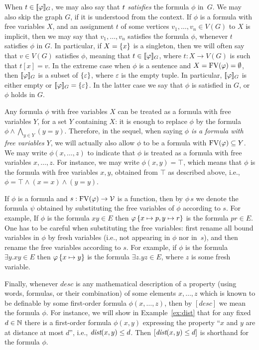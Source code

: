 When $t\in[\![\varphi]\!]_G$, we may also say that $t$ \emph{satisfies}
the formula $\phi$ in~$G$. We may also skip the graph $G$,
if it is understood from the context.
 If $\phi$ is a formula with 
free variables $X$, and an assignment $t$ of some vertices
$v_1,\ldots,v_n\in V(G)$  to $X$ is implicit,
then we may say that $v_1,\ldots,v_n$ 
satisfies the formula $\phi$, whenever  $t$ satisfies $\phi$ in $G$. In particular, if $X=\{x\}$ is a singleton, 
then we will often say that $v\in V(G)$ satisfies $\phi$,
meaning that  $t\in [\![\varphi]\!]_G$, where $t:X\to V(G)$ is  such that $t[x]=v$. In the extreme case when
$\phi$ is a sentence and $X=\textrm{FV}(\varphi)=\emptyset$, then $[\![\varphi]\!]_G$
is a subset of $\{\varepsilon\}$, where $\varepsilon$
is the {empty tuple}. In particular, $[\![\varphi]\!]_G$ is either empty  or $[\![\varphi]\!]_G=\{\varepsilon\}$. In the latter case we say that $\phi$ is satisfied in $G$, or $\phi$ holds in $G$. 

Any formula $\phi$ with free variables $X$ can be treated as a formula with free variables $Y$, for a set $Y$ containing $X$: it is enough to replace $\phi$
by the formula $\phi\land \bigwedge_{y\in Y}(y=y)$.
Therefore, in the sequel, when saying $\phi$
\emph{is a formula with free variables} $Y$, we will actually also allow $\phi$ to be a formula with $\textrm{FV}(\varphi)\subseteq Y$. 
We may write $\phi(x,\ldots,z)$ 
to indicate that $\phi$ is treated as a formula with free variables $x,\ldots,z$. For instance, we may write
$\phi(x,y)=\top$, which means that $\phi$ is the formula with free variables $x,y$, obtained from $\top$ as described above,
i.e., $\phi=\top\land(x=x)\land (y=y)$.

If $\phi$ is a formula and $s:\textrm{FV}(\varphi)\to\mathcal{V}$ is a function, then by $\phi\, s$ we denote the formula 
$\psi$ obtained by substituting the free variables of $\phi$
according to $s$. For example, 
If $\phi$ is the formula $xy\in E$ then $\varphi\, \{x\mapsto p,y\mapsto r\}$ is the formula $pr\in E$.
One has to be careful when substituting the free variables:
 first rename all bound variables in $\phi$
by fresh variables (i.e., not appearing in $\phi$ nor in~$s$), and then rename the free variables according to $s$. For example, if $\phi$ is the formula $\exists y.xy\in E$ then $\varphi\,\{x\mapsto y\}$ is the formula $\exists z.yz\in E$, where $z$ is some fresh variable.


Finally, whenever $\textit{desc}$ is any mathematical description of a property
(using words, formulas, or their combination) of some elements $x,\ldots,z$ which is known to be definable by some  first-order formula $\phi(x,\ldots,z)$, then by $[desc]$ we mean the formula $\phi$.
For instance, we will show in Example~\ref{ex:dist} 
that for any fixed $d\in \mathbb{N}$ there is a first-order formula $\phi(x,y)$ expressing the property 
``$x$ and $y$ are at distance at most $d$'', i.e., $\textit{dist}(x,y)\le d$. Then $[\textit{dist}(x,y)\le d]$ is shorthand for the formula $\phi$.




